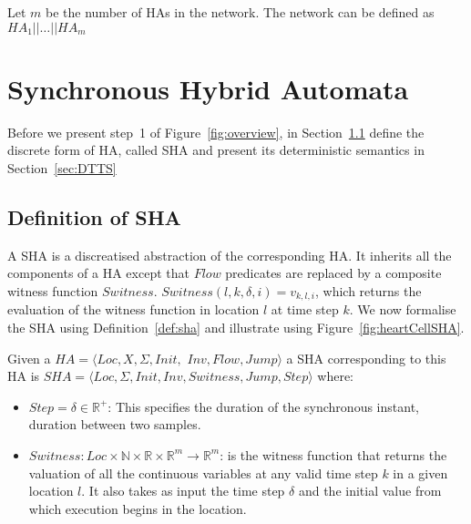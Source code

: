 \begin{definition}
	\label{def:nha}
	Let $m$  be the number of \acp{HA} in the network.
	The network can be defined as $HA_1 || \dots || HA_m$
\end{definition}

\section{Synchronous Hybrid Automata}
\label{sec:SHA}
 
Before we present step~1 of Figure~\ref{fig:overview},
in Section~\ref{sec:defSHA} define the discrete form of \ac{HA}, 
called \acf{SHA} and present its deterministic semantics in 
Section~\ref{sec:DTTS}

\subsection{Definition of \acf{SHA}}
\label{sec:defSHA}
A \ac{SHA} is a discreatised  abstraction of the corresponding \ac{HA}. 
It inherits all the
components of a \ac{HA} except that $Flow$ predicates are replaced by a
composite witness function $Switness$.
$Switness(l,k, \delta, i)=v_{k,l,i}$, which returns the evaluation of
the witness function in location $l$ at time step $k$.
We now formalise
the \ac{SHA} using Definition~\ref{def:sha} and illustrate using Figure~\ref{fig:heartCellSHA}.



\begin{definition}
	Given a 
	$HA = \langle Loc, X, \Sigma, Init,$ $ Inv, Flow, Jump \rangle$ a \ac{SHA} corresponding to
	this \ac{HA} is \newline
	$SHA = \langle Loc,  \Sigma, Init, Inv, Switness, Jump, Step \rangle$ where:
	\begin{itemize}
		\item $Step = \delta \in \mathbb{R}^+$: This specifies the duration of the synchronous instant,  duration between 
		two samples.
		\item
		$Switness: Loc \times \mathbb{N} \times \mathbb{R} \times
		\mathbb{R}^m \rightarrow \mathbb{R}^m$:
		is the witness function that returns the valuation of all the
		continuous variables at any valid time step $k$ in a given location
		$l$. It also takes as input the time step $\delta$ and the initial
		value from which execution begins in the location.
	\end{itemize}
	\label{def:sha}
\end{definition}



